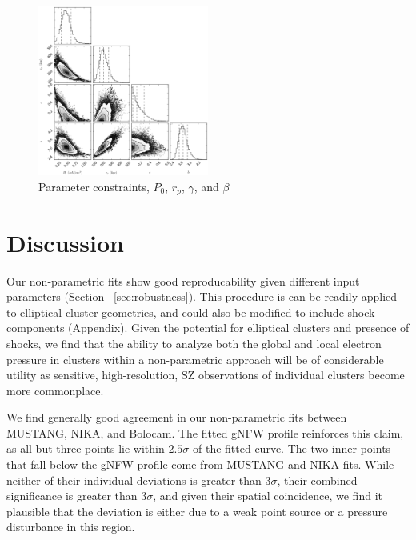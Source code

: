 \documentclass[iop,numberedappendix,apj]{emulateapj}
\begin{document}
\begin{figure}[!h]
  \centering
  \includegraphics[width=0.5\textwidth]{NIKA_ml_deproj_figs/Real_Joint_gNFW_Real_11011111_2500S_500B_100W_contour.eps}
  \caption{Parameter constraints, $P_0$, $r_p$, $\gamma$, and $\beta$}
  \label{fig:joint_constraints}
\end{figure}

\section{Discussion}
\label{sec:discussion}

Our non-parametric fits show good reproducability given different input parameters (Section ~\ref{sec:robustness}).
This procedure is can be readily applied to elliptical cluster geometries, and could also be modified
to include shock components (Appendix). Given the potential for elliptical clusters and presence of shocks,
we find that the ability to analyze both the global and local electron pressure in clusters within a
non-parametric approach will be of considerable utility as sensitive, high-resolution,
SZ observations of individual clusters become more commonplace.

We find generally good agreement in our non-parametric fits
between MUSTANG, NIKA, and Bolocam. The fitted gNFW profile reinforces this claim, as all but three points
lie within $2.5\sigma$ of the fitted curve. The two inner points that fall below the gNFW profile come from
MUSTANG and NIKA fits. While neither of their individual deviations is greater than $3\sigma$, their combined
significance is greater than $3\sigma$, and given their spatial coincidence, we find it plausible that the
deviation is either due to a weak point source or a pressure disturbance in this region.
\end{document}
